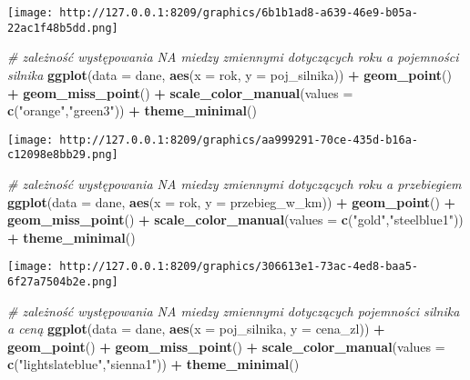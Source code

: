 \documentclass[
]{article}
\newenvironment{Shaded}{\begin{snugshade}}{\end{snugshade}}
\newcommand{\AttributeTok}[1]{\textcolor[rgb]{0.13,0.29,0.53}{#1}}
\newcommand{\CommentTok}[1]{\textcolor[rgb]{0.56,0.35,0.01}{\textit{#1}}}
\newcommand{\FunctionTok}[1]{\textcolor[rgb]{0.13,0.29,0.53}{\textbf{#1}}}
\newcommand{\NormalTok}[1]{#1}
\newcommand{\SpecialCharTok}[1]{\textcolor[rgb]{0.81,0.36,0.00}{\textbf{#1}}}
\newcommand{\StringTok}[1]{\textcolor[rgb]{0.31,0.60,0.02}{#1}}
\begin{document}
\texttt{[image: http://127.0.0.1:8209/graphics/6b1b1ad8-a639-46e9-b05a-22ac1f48b5dd.png]}

\begin{Shaded}
\begin{Highlighting}[]
\CommentTok{\# zależność występowania NA miedzy zmiennymi dotyczących roku a pojemności silnika }
\FunctionTok{ggplot}\NormalTok{(}\AttributeTok{data =}\NormalTok{ dane, }\FunctionTok{aes}\NormalTok{(}\AttributeTok{x =}\NormalTok{ rok, }\AttributeTok{y =}\NormalTok{ poj\_silnika)) }\SpecialCharTok{+} 
  \FunctionTok{geom\_point}\NormalTok{() }\SpecialCharTok{+}
  \FunctionTok{geom\_miss\_point}\NormalTok{() }\SpecialCharTok{+}
  \FunctionTok{scale\_color\_manual}\NormalTok{(}\AttributeTok{values =} \FunctionTok{c}\NormalTok{(}\StringTok{"orange"}\NormalTok{,}\StringTok{"green3"}\NormalTok{)) }\SpecialCharTok{+}
  \FunctionTok{theme\_minimal}\NormalTok{()}
\end{Highlighting}
\end{Shaded}

\texttt{[image: http://127.0.0.1:8209/graphics/aa999291-70ce-435d-b16a-c12098e8bb29.png]}

\begin{Shaded}
\begin{Highlighting}[]
\CommentTok{\# zależność występowania NA miedzy zmiennymi dotyczących roku a przebiegiem }
\FunctionTok{ggplot}\NormalTok{(}\AttributeTok{data =}\NormalTok{ dane, }\FunctionTok{aes}\NormalTok{(}\AttributeTok{x =}\NormalTok{ rok, }\AttributeTok{y =}\NormalTok{ przebieg\_w\_km)) }\SpecialCharTok{+} 
  \FunctionTok{geom\_point}\NormalTok{() }\SpecialCharTok{+}
  \FunctionTok{geom\_miss\_point}\NormalTok{() }\SpecialCharTok{+}
  \FunctionTok{scale\_color\_manual}\NormalTok{(}\AttributeTok{values =} \FunctionTok{c}\NormalTok{(}\StringTok{"gold"}\NormalTok{,}\StringTok{"steelblue1"}\NormalTok{)) }\SpecialCharTok{+}
  \FunctionTok{theme\_minimal}\NormalTok{()}
\end{Highlighting}
\end{Shaded}

\texttt{[image: http://127.0.0.1:8209/graphics/306613e1-73ac-4ed8-baa5-6f27a7504b2e.png]}

\begin{Shaded}
\begin{Highlighting}[]
\CommentTok{\# zależność występowania NA miedzy zmiennymi dotyczących pojemności silnika a ceną }
\FunctionTok{ggplot}\NormalTok{(}\AttributeTok{data =}\NormalTok{ dane, }\FunctionTok{aes}\NormalTok{(}\AttributeTok{x =}\NormalTok{ poj\_silnika, }\AttributeTok{y =}\NormalTok{ cena\_zl)) }\SpecialCharTok{+} 
  \FunctionTok{geom\_point}\NormalTok{() }\SpecialCharTok{+}
  \FunctionTok{geom\_miss\_point}\NormalTok{() }\SpecialCharTok{+}
  \FunctionTok{scale\_color\_manual}\NormalTok{(}\AttributeTok{values =} \FunctionTok{c}\NormalTok{(}\StringTok{"lightslateblue"}\NormalTok{,}\StringTok{"sienna1"}\NormalTok{)) }\SpecialCharTok{+}
  \FunctionTok{theme\_minimal}\NormalTok{()}
\end{Highlighting}
\end{Shaded}
\end{document}
